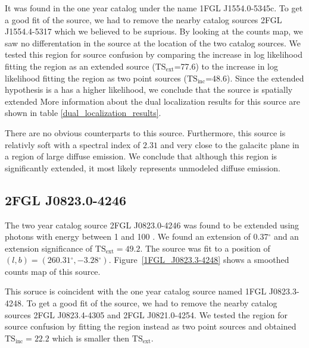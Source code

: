 \documentclass[12pt,preprint]{aastex}
\newcommand{\gev}{\text{GeV}\xspace}
\newcommand{\tsext}{{\ensuremath{\text{TS}_\text{ext}}}\xspace}
\newcommand{\tsinc}{\ensuremath{\text{TS}_\text{inc}}\xspace}
\renewcommand{\deg}{\ensuremath{^\circ}\xspace}
\begin{document}
It was found in the one year catalog under the name 1FGL J1554.0-5345c.
To get a good fit of the source, we had to remove the nearby catalog
sources 2FGL J1554.4-5317 which we believed to be suprious. By looking at
the counts map, we saw no differentation in the source at the location
of the two catalog sources. We tested this region for source confusion
by comparing the increase in log likelihood fitting the region as an
extended source (\tsext=77.6) to the increase in log likelihood fitting
the region as two point sources (\tsinc=48.6).  Since the extended
hypothesis is a has a higher likelihood, we conclude that the source is
spatially extended More
information about the dual localization results for this source are
shown in table \ref{dual_localization_results}.

There are no obvious counterparts to this source. Furthermore, this
source is relativly soft with a spectral index of $2.31$ and
very close to the galacitc plane in a region of large diffuse emission.
We conclude that although this region is significantly extended, it most
likely represents unmodeled diffuse emission.


\subsection{2FGL J0823.0-4246}


The two year catalog source 2FGL J0823.0-4246 was found to be
extended using photons with energy between 1 \gev and 100 \gev.
We found an extension of $0.37\deg$ and an extension
significance of $\tsext=49.2$.  The source was fit to a position of
$(l,b)=(260.31\deg,-3.28\deg)$.  Figure~\ref{1FGL_J0823.3-4248} shows
a smoothed counts map of this source.

This soruce is coincident with the one year catalog source named 1FGL J0823.3-4248.
To get a good fit of the source, we had to remove the nearby catalog
sources 2FGL J0823.4-4305 and 2FGL J0821.0-4254.  We tested the 
region for source confusion by fitting the region instead as two point
sources and obtained $\tsinc=22.2$ which is smaller then \tsext.

\end{document}
